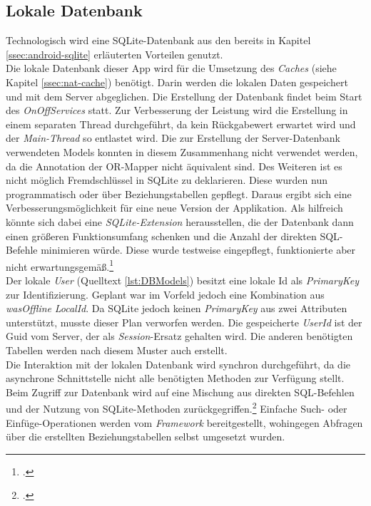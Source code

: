 \subsection{Lokale Datenbank}
\label{ssec:nat-db}
Technologisch wird eine SQLite-Datenbank aus den bereits in Kapitel \ref{ssec:android-sqlite} erläuterten Vorteilen genutzt.\\
Die lokale Datenbank dieser App wird für die Umsetzung des \textit{Caches} (siehe Kapitel \ref{ssec:nat-cache}) benötigt. Darin werden die lokalen Daten gespeichert und mit dem Server abgeglichen.
Die Erstellung der Datenbank findet beim Start des \textit{OnOffServices} statt. Zur Verbesserung der Leistung wird die Erstellung in einem separaten Thread durchgeführt, da kein Rückgabewert erwartet wird und der \textit{Main-Thread} so entlastet wird. Die zur Erstellung der Server-Datenbank verwendeten Models konnten in diesem Zusammenhang nicht verwendet werden, da die Annotation der OR-Mapper nicht äquivalent sind. Des Weiteren ist es nicht möglich Fremdschlüssel in SQLite zu deklarieren. Diese wurden nun programmatisch oder über Beziehungstabellen gepflegt. Daraus ergibt sich eine Verbesserungsmöglichkeit für eine neue Version der Applikation. Als hilfreich könnte sich dabei eine \textit{SQLite-Extension} herausstellen, die der Datenbank dann einen größeren Funktionsumfang schenken und die Anzahl der direkten SQL-Befehle minimieren würde. Diese wurde testweise eingepflegt, funktionierte aber nicht erwartungsgemäß.\footcite{Android-SQLiteExtension}\\

Der lokale \textit{User} (Quelltext \ref{lst:DBModels}) besitzt eine lokale Id als \textit{PrimaryKey} zur Identifizierung. Geplant war im Vorfeld jedoch eine Kombination aus \textit{wasOffline} \textit{LocalId}. Da SQLite jedoch keinen \textit{PrimaryKey} aus zwei Attributen unterstützt, musste dieser Plan verworfen werden. Die gespeicherte \textit{UserId} ist der Guid vom Server, der als \textit{Session}-Ersatz gehalten wird. Die anderen benötigten Tabellen werden nach diesem Muster auch erstellt.\\
Die Interaktion mit der lokalen Datenbank wird synchron durchgeführt, da die asynchrone Schnittstelle nicht alle benötigten Methoden zur Verfügung stellt. Beim Zugriff zur Datenbank wird auf eine Mischung aus direkten SQL-Befehlen und der Nutzung von SQLite-Methoden zurückgegriffen.\footcite[Vgl.]{Android-SQLiteORM} Einfache Such- oder Einfüge-Operationen werden vom \textit{Framework} bereitgestellt, wohingegen Abfragen über die erstellten Beziehungstabellen selbst umgesetzt wurden.
